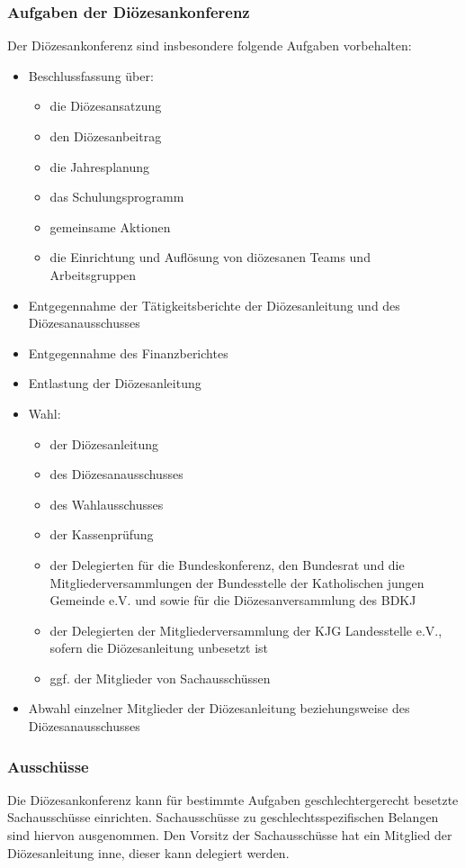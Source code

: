 \documentclass[12pt]{report}
\begin{document}
\begin{flushleft}
\subsubsection{Aufgaben der Diözesankonferenz}
Der Diözesankonferenz sind insbesondere folgende Aufgaben vorbehalten:
\begin{itemize}	
  \item Beschlussfassung über:
    \begin{itemize} 
      \item die Diözesansatzung
      \item den Diözesanbeitrag
      \item die Jahresplanung
      \item das Schulungsprogramm
      \item gemeinsame Aktionen
      \item die Einrichtung und Auflösung von diözesanen Teams und Arbeitsgruppen
    \end{itemize}
  \item Entgegennahme der Tätigkeitsberichte der Diözesanleitung und des Diözesanausschusses
  \item Entgegennahme des Finanzberichtes
  \item Entlastung der Diözesanleitung
  \item Wahl:
    \begin{itemize}
      \item der Diözesanleitung
      \item des Diözesanausschusses
      \item des Wahlausschusses
      \item der Kassenprüfung
      \item der Delegierten für die Bundeskonferenz, den Bundesrat und die 
            Mitgliederversammlungen der Bundesstelle der Katholischen jungen Gemeinde e.V. und sowie für die
            Diözesanversammlung des BDKJ
      \item der Delegierten der Mitgliederversammlung der KJG Landesstelle e.V., sofern die Diözesanleitung
            unbesetzt ist
      \item ggf. der Mitglieder von Sachausschüssen
    \end{itemize}
  \item Abwahl einzelner Mitglieder der Diözesanleitung beziehungsweise des Diözesanausschusses
\end{itemize}
\subsubsection{Ausschüsse}
Die Diözesankonferenz kann für bestimmte Aufgaben {\color{red}geschlechtergerecht} besetzte Sachausschüsse einrichten.
Sachausschüsse zu geschlechtsspezifischen Belangen sind hiervon ausgenommen.
Den Vorsitz der Sachausschüsse hat ein Mitglied der Diözesanleitung inne, dieser kann delegiert
werden.


\end{flushleft}
\end{document}
